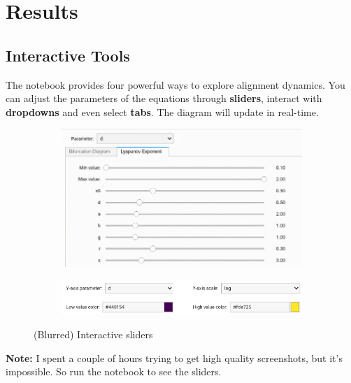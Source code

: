 \documentclass[a4paper, 10pt]{article}
\begin{document}
\clearpage
\section{Results}
\label{sec:results}
\subsection{Interactive Tools}
The notebook provides four powerful ways to explore alignment dynamics. 
You can adjust the parameters of the equations through \textbf{sliders}, interact with \textbf{dropdowns} and even select \textbf{tabs}. The diagram will update in real-time.

\begin{figure}[h!]
    \centering
    \begin{subfigure}{0.45\textwidth}
        \centering
        \includegraphics[width=\linewidth]{../images/results/slid-1.pdf}
        \label{fig:sliders1}
    \end{subfigure}
    \hfill
    \begin{subfigure}{0.45\textwidth}
        \centering
        \includegraphics[width=\linewidth]{../images/results/slid-2.png}
        \label{fig:sliders2}
    \end{subfigure}
    \caption{(Blurred) Interactive sliders}
    \label{fig:side_by_side}
\end{figure}

{\footnotesize \textbf{Note:} I spent a couple of hours trying to get high quality screenshots, but it's impossible. So run the notebook to see the sliders.
}
\end{document}
